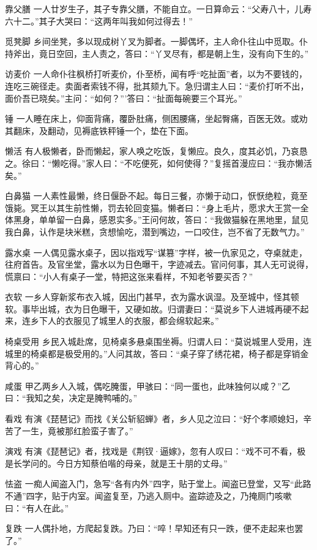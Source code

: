 \documentclass[12pt,UTF8]{ctexbook}
\begin{document}
靠父膳
一人廿岁生子，其子专靠父膳，不能自立。一日算命云：“父寿八十，儿寿六十二。”其子大哭曰：“这两年叫我如何过得去！”

觅凳脚
乡间坐凳，多以现成树丫叉为脚者。一脚偶坏，主人命仆往山中觅取。仆持斧出，竟日空回，主人责之，答曰：“丫叉尽有，都是朝上生，没有向下生的。”

访麦价
一人命仆往枫桥打听麦价，仆至桥，闻有呼“吃扯面”者，以为不要钱的，连吃三碗径走。卖面者索钱不得，批其颏九下。急归谓主人曰：“麦价打听不出，面价吾已晓矣。”主问：“如何？”’答曰：“扯面每碗要三个耳光。”

锤
一人睡在床上，仰面背痛，覆卧肚痛，侧困腰痛，坐起臀痛，百医无效。或劝其翻床，及翻动，见褥底铁秤锤一个，垫在下面。

懒活
有人极懒者，卧而懒起，家人唤之吃饭，复懒应。良久，度其必饥，乃哀恳之。徐曰：“懒吃得。”家人曰：“不吃便死，如何使得？”复摇首漫应曰：“我亦懒活矣。”

白鼻猫
一人素性最懒，终日偃卧不起。每日三餐，亦懒于动口，恹恹绝粒，竟至饿毙。冥王以其生前性懒，罚去轮回变猫。懒者曰：“身上毛片，愿求大王赏一全体黑身，单单留一白鼻，感恩实多。”王问何故，答曰：“我做猫躲在黑地里，鼠见我白鼻，认作是块米糕，贪想愉吃，潜到嘴边，一口咬住，岂不省了无数气力。”

露水桌
一人偶见露水桌子，因以指戏写“谋篡”字样，被一仇家见之，夺桌就走，往府首告。及官坐堂，露水以为日色曝干，字迹减去。官问何事，其人无可说得，慌禀曰：“小人有桌子一堂，特把这张来看样，不知老爷要买否？”

衣软
一乡人穿新浆布衣入城，因出门甚早，衣为露水讽湿。及至城中，怪其顿软。事毕出城，衣为日色曝干，又硬如故。归谓妻曰：“莫说乡下人进城再硬不起来，连乡下人的衣服见了城里人的衣服，都会绵软起来。”

椅桌受用
乡民入城赴席，见椅桌多悬桌围坐褥。归谓人曰：“莫说城里人受用，连城里的椅桌都是极受用的。”人问其故，答曰：“桌子穿了绣花裙，椅子都是穿销金背心的。”

咸蛋
甲乙两乡人入城，偶吃腌蛋，甲骇曰：“同一蛋也，此味独何以咸？”乙曰：“我知之矣，决定是腌鸭哺的。”

看戏
有演《琵琶记》而找《关公斩貂蝉》者，乡人见之泣曰：“好个孝顺媳妇，辛苦了一生，竟被那红脸蛮子害了。”

演戏
有演《琵琶记》者，找戏是《荆钗·逼嫁》，忽有人叹曰：“戏不可不看，极是长学问的。今日方知蔡伯喈的母亲，就是王十朋的丈母。”

怯盗
一痴人闻盗入门，急写“各有内外”四字，贴于堂上。闻盗已登堂，又写“此路不通”四字，贴于内室。闻盗复至，乃逃入厕中。盗踪迹及之，乃掩厕门咳嗽曰：“有人在此。”

复跌
一人偶扑地，方爬起复跌。乃曰：“啐！早知还有只一跌，便不走起来也罢了。”
\end{document}
